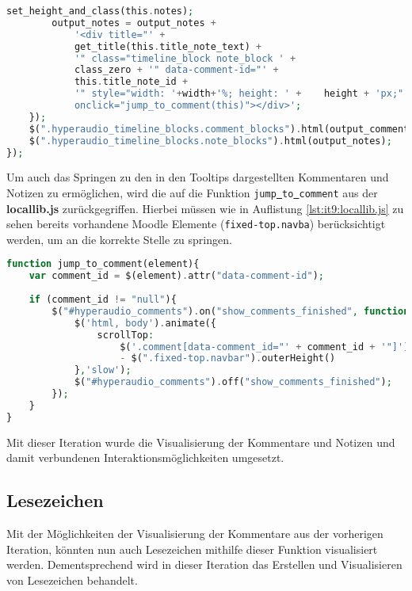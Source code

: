 \begin{lstlisting}[language=php,
             linewidth=\textwidth,
             caption={Ausschnitt der \textbf{hyperaudio.js} in der 9. Iteration},
             label={lst:it9:hyperaudio}]
        set_height_and_class(this.notes);
        output_notes = output_notes +
            '<div title="' +
            get_title(this.title_note_text) + 
            '" class="timeline_block note_block ' +
            class_zero + '" data-comment-id="' +
            this.title_note_id + 
            '" style="width: '+width+'%; height: ' +	height + 'px;"
            onclick="jump_to_comment(this)"></div>';
    });
    $(".hyperaudio_timeline_blocks.comment_blocks").html(output_comments);
    $(".hyperaudio_timeline_blocks.note_blocks").html(output_notes);
});
\end{lstlisting}

Um auch das Springen zu den in den Tooltips dargestellten Kommentaren und Notizen zu ermöglichen, wird die auf die Funktion  \texttt{jump\underline{{ }}to\underline{{ }}comment} aus der \textbf{locallib.js} zurückgegriffen. Hierbei müssen wie in Auflistung \ref{lst:it9:locallib.js} zu sehen bereits vorhandene Moodle Elemente (\texttt{fixed-top.navba}) berücksichtigt werden, um an die korrekte Stelle zu springen.

\begin{lstlisting}[language=php,
             linewidth=\textwidth,
             caption={Ausschnitt der \textbf{locallib.js} in der 9. Iteration},
             label={lst:it9:locallib.js}]
function jump_to_comment(element){
    var comment_id = $(element).attr("data-comment-id");
	
    if (comment_id != "null"){
        $("#hyperaudio_comments").on("show_comments_finished", function(){
            $('html, body').animate({
                scrollTop:
                    $('.comment[data-comment_id="' + comment_id + '"]').offset().top
                    - $(".fixed-top.navbar").outerHeight()
            },'slow');
            $("#hyperaudio_comments").off("show_comments_finished");
        });
    }
}
\end{lstlisting}


Mit dieser Iteration wurde die Visualisierung der Kommentare und Notizen und damit verbundenen Interaktionsmöglichkeiten umgesetzt.

\subsection{Lesezeichen}
Mit der Möglichkeiten der Visualisierung der Kommentare aus der vorherigen Iteration, könnten nun auch Lesezeichen mithilfe dieser Funktion visualisiert werden. Dementsprechend wird in dieser Iteration das Erstellen und Visualisieren von Lesezeichen behandelt.

